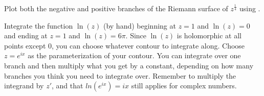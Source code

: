 \begin{problem}
Plot both the negative and positive branches of the Riemann surface of $z^{\frac{1}{4}}$ using .
\end{problem}

\begin{problem}
Integrate the function $\ln(z)$ (by hand) beginning at $z=1$ and $\ln(z)=0$ and ending at $z=1$ and $\ln(z)=6\pi$.
Since $\ln(z)$ is holomorphic at all points except 0, you can choose whatever contour to integrate along. Choose $z=e^{ix}$ as the parameterization of your contour. You can integrate over one branch and then multiply what you get by a constant, depending on how many branches you think you need to integrate over. Remember to multiply the integrand by $z'$, and that $ln(e^{ix})=ix$ still applies for complex numbers.
\end{problem}
